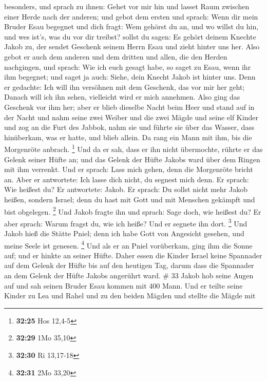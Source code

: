 besonders, und sprach zu ihnen: Gehet vor mir hin und lasset Raum
zwischen einer Herde nach der anderen;  und gebot dem
ersten und sprach: Wenn dir mein Bruder Esau begegnet und dich fragt:
Wem gehörst du an, und wo willst du hin, und wes ist's, was du vor dir
treibst?  sollst du sagen: Es gehört deinem Knechte Jakob
zu, der sendet Geschenk seinem Herrn Esau und zieht hinter uns her.
 Also gebot er auch dem anderen und dem dritten und
allen, die den Herden nachgingen, und sprach: Wie ich euch gesagt habe,
so saget zu Esau, wenn ihr ihm begegnet;  und saget ja
auch: Siehe, dein Knecht Jakob ist hinter uns. Denn er gedachte: Ich
will ihn versöhnen mit dem Geschenk, das vor mir her geht; Danach will
ich ihn sehen, vielleicht wird er mich annehmen.  Also
ging das Geschenk vor ihm her; aber er blieb dieselbe Nacht beim Heer
 und stand auf in der Nacht und nahm seine zwei Weiber
und die zwei Mägde und seine elf Kinder und zog an die Furt des Jabbok,
 nahm sie und führte sie über das Wasser, dass
hinüberkam, was er hatte,  und blieb allein. Da rang ein
Mann mit ihm, bis die Morgenröte anbrach. \footnote{\textbf{32:25} Hos
  12,4-5}  Und da er sah, dass er ihn nicht übermochte,
rührte er das Gelenk seiner Hüfte an; und das Gelenk der Hüfte Jakobs
ward über dem Ringen mit ihm verrenkt.  Und er sprach:
Lass mich gehen, denn die Morgenröte bricht an. Aber er antwortete: Ich
lasse dich nicht, du segnest mich denn.  Er sprach: Wie
heißest du? Er antwortete: Jakob.  Er sprach: Du sollst
nicht mehr Jakob heißen, sondern Israel; denn du hast mit Gott und mit
Menschen gekämpft und bist obgelegen. \footnote{\textbf{32:29} 1Mo 35,10}
 Und Jakob fragte ihn und sprach: Sage doch, wie heißest
du? Er aber sprach: Warum fragst du, wie ich heiße? Und er segnete ihn
dort. \footnote{\textbf{32:30} Ri 13,17-18}  Und Jakob
hieß die Stätte Pniel; denn ich habe Gott von Angesicht gesehen, und
meine Seele ist genesen. \footnote{\textbf{32:31} 2Mo 33,20}
 Und als er an Pniel vorüberkam, ging ihm die Sonne auf;
und er hinkte an seiner Hüfte.  Daher essen die Kinder
Israel keine Spannader auf dem Gelenk der Hüfte bis auf den heutigen
Tag, darum dass die Spannader an dem Gelenk der Hüfte Jakobs angerührt
ward. \# 33  Jakob hob seine Augen auf und sah seinen
Bruder Esau kommen mit 400 Mann. Und er teilte seine Kinder zu Lea und
Rahel und zu den beiden Mägden  und stellte die Mägde mit
